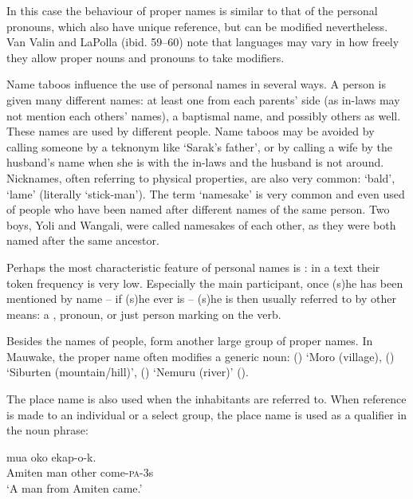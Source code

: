 In this case the behaviour of proper names is similar to that of the personal pronouns, which also have unique reference, but can be modified nevertheless. {Van Valin and LaPolla} (ibid. 59--60) note that languages may vary in how freely they allow proper nouns and pronouns to take modifiers.

Name taboos influence the use of personal names in several ways. A person is given many different names: at least one from each parents' side (as in-laws may not mention each others' names), a baptismal name, and possibly others as well. These names are used by different people. Name taboos may be avoided by calling someone by a teknonym like `Sarak's father', or by calling a wife by the husband's name when she is with the in-laws and the husband is not around. Nicknames, often referring to physical properties, are also very common:  `bald',  `lame' (literally `stick-man'). The term `namesake' is very common and even used of people who have been named after different names of the same person. Two boys, Yoli and Wangali, were called namesakes of each other, as they were both named after the same ancestor. 

Perhaps the most characteristic feature of personal names is : in a text their token frequency is very low. Especially the main participant, once (s)he has been mentioned by name -- if (s)he ever is -- (s)he is then usually referred to by other means: a , pronoun, or just person marking on the verb. 

Besides the names of people,  form another large group of proper names. In Mauwake, the proper name often modifies a generic noun:  () `Moro (village),  () `Siburten (mountain/hill)',  () `Nemuru (river)' (). 

The place name is also used when the inhabitants are referred to. When reference is made to an individual or a select group, the place name is used as a qualifier in the noun phrase: 

\ea%
\label{ex:x421}
\gll {}  mua oko ekap-o-k. \\
Amiten man other come-\textsc{pa}-3s\\
\glt`A man from Amiten came.'
\z


